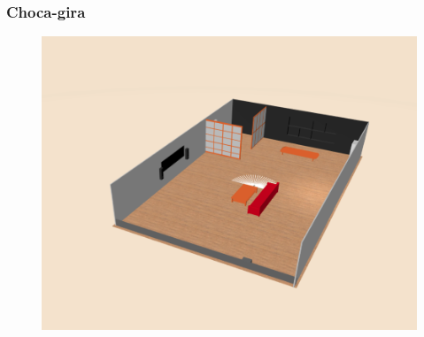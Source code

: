 \documentclass[xcolor={table}]{beamer}
\begin{document}
		
		\begin{frame}
			\frametitle{Choca-gira}
						\begin{figure}{\textwidth}
             \includegraphics[scale=0.25]{img/bump&go.png}
             \label{fig:chocagira}
            \end{figure}
		\end{frame}
		
\end{document}
